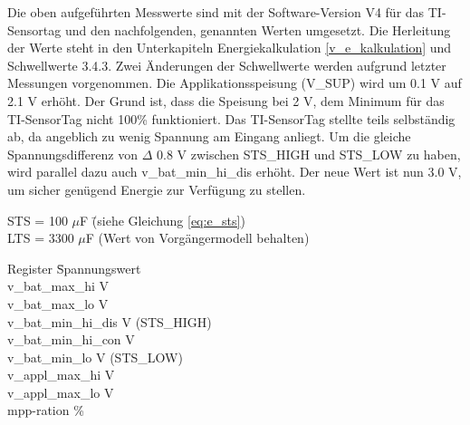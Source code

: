 Die oben aufgeführten Messwerte sind mit der Software-Version V4 für das TI-Sensortag und den nachfolgenden, genannten Werten umgesetzt. Die Herleitung der Werte steht in den Unterkapiteln Energiekalkulation \ref{v_e_kalkulation} und Schwellwerte 3.4.3. Zwei Änderungen der Schwellwerte werden aufgrund letzter Messungen vorgenommen. Die Applikationsspeisung (V\_SUP) wird um 0.1 V auf 2.1 V erhöht. Der Grund ist, dass die Speisung bei 2 V, dem Minimum für das TI-SensorTag nicht 100\thinspace\% funktioniert. Das TI-SensorTag stellte teils selbständig ab, da angeblich zu wenig Spannung am Eingang anliegt. Um die gleiche Spannungsdifferenz von $\Delta$ 0.8 V zwischen STS\_HIGH und STS\_LOW zu haben, wird parallel dazu auch  v\_bat\_min\_hi\_dis erhöht. Der neue Wert ist nun 3.0 V, um sicher genügend Energie zur Verfügung zu stellen.


\begin{tabbing}
STS = 100 $\mu$F \hspace{1cm} \= (siehe Gleichung \ref{eq:e_sts})\\
LTS = 3300 $\mu$F             \> (Wert von Vorgängermodell behalten)
\end{tabbing}

\begin{minipage}{\textwidth}
    \begin{tabbing}
        Register \hspace{2cm} \quad\= Spannungswert \\[0.8ex]
        v\_bat\_max\_hi        V \\
        v\_bat\_max\_lo        V \\
        v\_bat\_min\_hi\_dis   V  (STS\_HIGH)\\
        v\_bat\_min\_hi\_con   V \\
        v\_bat\_min\_lo        V (STS\_LOW)\\
        v\_appl\_max\_hi       V \\
        v\_appl\_max\_lo       V \\   
        mpp-ration            \thinspace\%
    \end{tabbing}
\end{minipage}  




